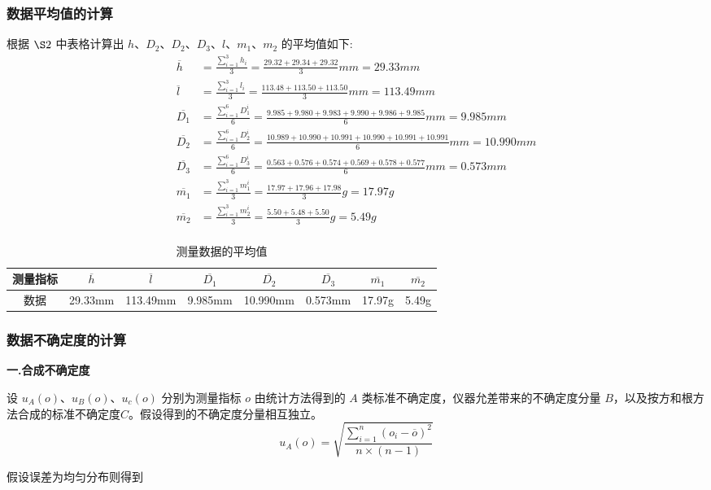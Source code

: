 \documentclass[UTF8]{ctexart}
\begin{document}
\subsubsection{数据平均值的计算}
根据 $\S 2$ 中表格计算出 $h$、$D_2$、$D_2$、$D_3$、$l$、$m_1$、$m_2$ 的平均值如下:
\begin{align*}
    \overline{h} &= \frac{\sum_{i=1}^3 h_i}{3} = \frac{29.32+29.34+29.32}{3} mm = 29.33 mm\\
    \overline{l} &= \frac{\sum_{i=1}^3 l_i}{3} = \frac{113.48+113.50+113.50}{3} mm = 113.49 mm \\
    \overline{D_1} &= \frac{\sum_{i=1}^6 D_1^i}{6} = \frac{9.985+9.980+9.983+9.990+9.986+9.985}{6} mm = 9.985 mm\\
    \overline{D_2} &= \frac{\sum_{i=1}^6 D_2^i}{6} = \frac{10.989+10.990+10.991+10.990+10.991+10.991}{6} mm = 10.990 mm\\
    \overline{D_3} &= \frac{\sum_{i=1}^6 D_3^i}{6}  =  \frac{0.563+0.576+0.574+0.569+0.578+0.577}{6} mm =  0.573mm\\
    \overline{m_1} &= \frac{\sum_{i=1}^3 m_1^i}{3} = \frac{17.97+17.96+17.98}{3}  g=  17.97g\\
    \overline{m_2} &= \frac{\sum_{i=1}^3 m_2^i}{3} = \frac{5.50+5.48+5.50}{3}g  =  5.49g\\
\end{align*}

\begin{table}[H]
\centering
\caption*{测量数据的平均值}
\begin{tabular}{c c c c c c c c}
\toprule[1pt]
\midrule
     测量指标 & $\overline{h}$ & $\overline{l}$ & $\overline{D_1}$ & $\overline{D_2}$ & $\overline{D_3}$ & $\overline{m_1}$ & $\overline{m_2}$  \\
\midrule
     数据 & 29.33mm& 113.49mm& 9.985mm & 10.990mm&0.573mm & 17.97g  &5.49g\\
\midrule
\bottomrule[1pt]
\end{tabular}
\end{table}

\subsubsection{数据不确定度的计算}

\begin{spacing}{1.2}
\textbf{一.合成不确定度}

设 $u_A(o)$、$u_B(o)$、$u_c(o)$ 分别为测量指标 $o$ 由统计方法得到的 $A$ 类标准不确定度，仪器允差带来的不确定度分量 $B$，以及按方和根方法合成的标准不确定度$C$。假设得到的不确定度分量相互独立。
$$
u_A(o) = \sqrt{\frac{\sum_{i=1}^n (o_i - \overline{o})^2}{n\times (n-1)}}
$$

假设误差为均匀分布则得到 
\end{spacing}
\end{document}
